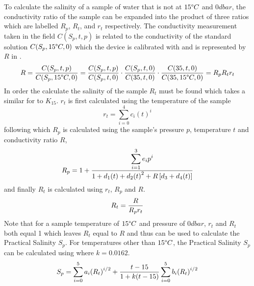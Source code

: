 To calculate the salinity of a sample of water that is not at $15\degree C$ and $0 dbar$, the conductivity ratio of the sample can be expanded into the product of three ratios which are labelled $R_p$, $R_t$, and $r_t$ respectively.
The conductivity measurement taken in the field $C(S_p, t, p)$ is related to the conductivity of the standard solution $C(S_p, 15\degree C, 0)$ which the device is calibrated with and is represented by $R$ in .~\cite{ioc_teos_2010}
\begin{equation}\label{eq:pss-78-full-ratio}
    R = \frac{\displaystyle C(S_p, t, p)}{\displaystyle C(S_p, 15\degree C, 0)} = \frac{\displaystyle C(S_p, t, p)}{\displaystyle C(S_p, t, 0)} \cdot \frac{\displaystyle C(S_p, t, 0)}{\displaystyle C(35, t, 0)} \cdot \frac{\displaystyle C(35, t, 0)}{\displaystyle C(35, 15\degree C, 0)} = R_p R_t r_t
\end{equation}
In order the calculate the salinity of the sample $R_t$ must be found which takes a similar for to $K_{15}$.
$r_t$ is first calculated using the temperature of the sample 
\begin{equation}\label{eq:pss-78-rt}
    r_t = \sum_{i=0}^{4} c_i {(t)}^i
\end{equation}
following which $R_p$ is calculated using the sample's pressure $p$, temperature $t$ and conductivity ratio $R$,
\begin{equation}\label{eq:pss-78-rp}
    R_p = 1 + \frac{\displaystyle \sum_{i=1}^{3} e_i p^i}{\displaystyle 1 + d_1 (t) + d_2 {(t)}^2 + R\left[ d_3 + d_4 (t) \right]}
\end{equation}
and finally $R_t$ is calculated using $r_t$, $R_p$ and $R$.
\begin{equation}\label{eq:pss-78-Rt}
    R_t = \frac{\displaystyle R}{\displaystyle R_p r_t}
\end{equation}
Note that for a sample temperature of $15\degree C$ and pressure of $0 dbar$, $r_t$ and $R_t$ both equal 1 which leaves $R_t$ equal to $R$ and thus  can be used to calculate the Practical Salinity $S_p$.
For temperatures other than $15\degree C$, the Practical Salinity $S_p$ can be calculated using  where $k = 0.0162$.~\cite{ioc_teos_2010}
\begin{equation}\label{eq:pss-78-full}
    S_p = \sum_{i=0}^{5} a_i {(R_t)}^{i/2} + \frac{\displaystyle t-15}{\displaystyle 1+k(t-15)} \sum_{i=0}^{5} b_i {(R_t)}^{i/2}
\end{equation}

